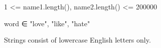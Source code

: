 1 <= name1.length(), name2.length() <= 200000

word ∈ {"love", "like", "hate"}

Strings consist of lowercase English letters only.